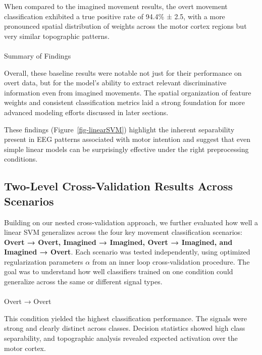 \documentclass[
  letterpaper,
  DIV=11,
  numbers=noendperiod]{scrartcl}
\makeatletter
\let\oldparagraph\paragraph
\renewcommand{\paragraph}{
    \@ifstar
      \xxxParagraphStar
      \xxxParagraphNoStar
  }
\newcommand{\xxxParagraphStar}[1]{\oldparagraph*{#1}\mbox{}}
\newcommand{\xxxParagraphNoStar}[1]{\oldparagraph{#1}\mbox{}}
\makeatother
\begin{document}
When compared to the imagined movement results, the overt movement
classification exhibited a true positive rate of 94.4\% ± 2.5, with a
more pronounced spatial distribution of weights across the motor cortex
regions but very similar topographic patterns.

\paragraph{Summary of Findings}\label{summary-of-findings}

Overall, these baseline results were notable not just for their
performance on overt data, but for the model's ability to extract
relevant discriminative information even from imagined movements. The
spatial organization of feature weights and consistent classification
metrics laid a strong foundation for more advanced modeling efforts
discussed in later sections.

These findings (Figure~\ref{fig-linearSVM}) highlight the inherent
separability present in EEG patterns associated with motor intention and
suggest that even simple linear models can be surprisingly effective
under the right preprocessing conditions.

\subsection{Two-Level Cross-Validation Results Across
Scenarios}\label{two-level-cross-validation-results-across-scenarios}

Building on our nested cross-validation approach, we further evaluated
how well a linear SVM generalizes across the four key movement
classification scenarios: \textbf{Overt → Overt, Imagined → Imagined,
Overt → Imagined, and Imagined → Overt}. Each scenario was tested
independently, using optimized regularization parameters \(\alpha\) from
an inner loop cross-validation procedure. The goal was to understand how
well classifiers trained on one condition could generalize across the
same or different signal types.

\paragraph{Overt → Overt}\label{overt-overt}

This condition yielded the highest classification performance. The
signals were strong and clearly distinct across classes. Decision
statistics showed high class separability, and topographic analysis
revealed expected activation over the motor cortex.
\end{document}
